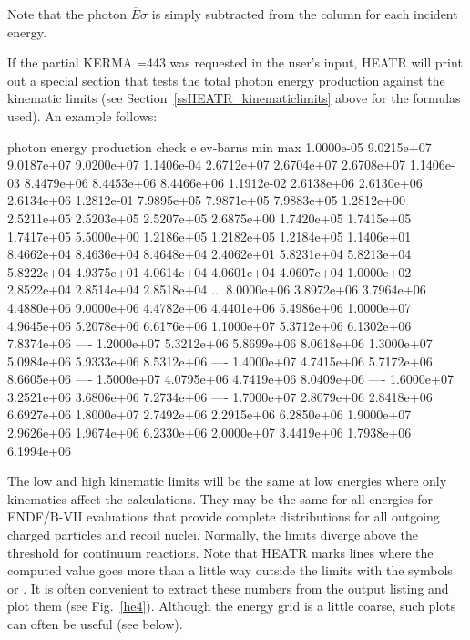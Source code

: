 \noindent
Note that the photon $\overline{E}\sigma$ is simply subtracted from
the  column for each incident energy.

If the partial KERMA =443 was requested in the user's
input, HEATR will print out a special section that tests the
total photon energy production against the kinematic limits
(see Section~\ref{ssHEATR_kinematiclimits} above for the formulas used).
An example follows:

\small
\begin{ccode}

 photon energy production check
              e      ev-barns           min           max
     1.0000e-05    9.0215e+07    9.0187e+07    9.0200e+07
     1.1406e-04    2.6712e+07    2.6704e+07    2.6708e+07
     1.1406e-03    8.4479e+06    8.4453e+06    8.4466e+06
     1.1912e-02    2.6138e+06    2.6130e+06    2.6134e+06
     1.2812e-01    7.9895e+05    7.9871e+05    7.9883e+05
     1.2812e+00    2.5211e+05    2.5203e+05    2.5207e+05
     2.6875e+00    1.7420e+05    1.7415e+05    1.7417e+05
     5.5000e+00    1.2186e+05    1.2182e+05    1.2184e+05
     1.1406e+01    8.4662e+04    8.4636e+04    8.4648e+04
     2.4062e+01    5.8231e+04    5.8213e+04    5.8222e+04
     4.9375e+01    4.0614e+04    4.0601e+04    4.0607e+04
     1.0000e+02    2.8522e+04    2.8514e+04    2.8518e+04
   ...
     8.0000e+06    3.8972e+06    3.7964e+06    4.4880e+06
     9.0000e+06    4.4782e+06    4.4401e+06    5.4986e+06
     1.0000e+07    4.9645e+06    5.2078e+06    6.6176e+06
     1.1000e+07    5.3712e+06    6.1302e+06    7.8374e+06   ----
     1.2000e+07    5.3212e+06    5.8699e+06    8.0618e+06
     1.3000e+07    5.0984e+06    5.9333e+06    8.5312e+06   ----
     1.4000e+07    4.7415e+06    5.7172e+06    8.6605e+06   ----
     1.5000e+07    4.0795e+06    4.7419e+06    8.0409e+06   ----
     1.6000e+07    3.2521e+06    3.6806e+06    7.2734e+06   ----
     1.7000e+07    2.8079e+06    2.8418e+06    6.6927e+06
     1.8000e+07    2.7492e+06    2.2915e+06    6.2850e+06
     1.9000e+07    2.9626e+06    1.9674e+06    6.2330e+06
     2.0000e+07    3.4419e+06    1.7938e+06    6.1994e+06

\end{ccode}
\normalsize

\noindent
The low and high kinematic limits
will be the same at low energies where only kinematics affect
the calculations.  They may be the same for all energies for
ENDF/B-VII evaluations that provide complete distributions
for all outgoing charged particles and recoil nuclei.  Normally,
the limits diverge above the threshold for continuum reactions.
Note that HEATR marks lines where the computed value goes more
than a little way outside the limits with the symbols \cword{++++}
or \cword{----}.  It is often convenient to extract these
numbers from the output listing and plot them (see Fig.~\ref{he4}).
Although the energy grid is a little coarse, such plots can
often be useful (see below).

